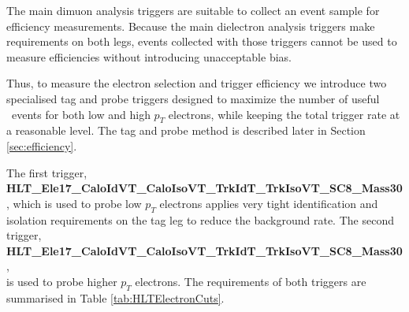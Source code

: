 The main dimuon analysis triggers are suitable to collect an event sample
for efficiency measurements.
Because the main dielectron analysis triggers make requirements on
both legs, events collected with those triggers cannot be used to measure
efficiencies without introducing unacceptable bias.

Thus, to measure the electron selection and trigger efficiency
we introduce two specialised tag and probe triggers designed to maximize
the number of useful \dyll~events for both low and high $p_{T}$ electrons,
while keeping the total trigger rate at a reasonable level. 
The tag and probe method is described later in Section \ref{sec:efficiency}.

The first trigger, {\bf HLT\_Ele17\_CaloIdVT\_CaloIsoVT\_TrkIdT\_TrkIsoVT\_SC8\_Mass30},
which is used to probe low $p_T$ electrons
applies very tight identification and isolation requirements on the tag leg to reduce the background rate.
The second trigger, \\{\bf HLT\_Ele17\_CaloIdVT\_CaloIsoVT\_TrkIdT\_TrkIsoVT\_SC8\_Mass30},\\
is used to probe higher $p_{T}$ electrons.
The requirements of both triggers are summarised in Table \ref{tab:HLTElectronCuts}.


%

